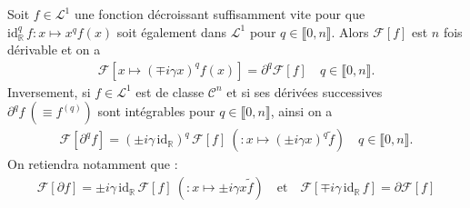 \begin{Theo} Soit $f \in \mathcal L^1$ une fonction décroissant suffisamment vite pour que $\mathrm{id}_{\mathbb R}^q \,   f \colon x \mapsto x^q f (x)$ soit également dans $\mathcal L^1$ pour $q \in \llbracket 0 , n \rrbracket$. Alors $\mathcal F[f]$ est $n$ fois dérivable et on a 
\begin{eqnarray}
 \mathcal F[x \mapsto (\mp i \gamma x)^q f(x)] = \partial^q \mathcal F[f] \quad q \in \llbracket 0 , n \rrbracket.
\end{eqnarray}
Inversement, si $f\in \mathcal L^1$ est de classe $\mathcal C^n$ et si ses dérivées successives $ \partial^q f ~ (\equiv f^{(q)})$ sont intégrables pour $q \in \llbracket 0 , n \rrbracket$, ainsi on a 
\begin{eqnarray}
 \mathcal F[\partial^q f] = (\pm i \gamma \, \mathrm{id}_{\mathbb R})^q \, \mathcal F[f] ~(\colon x \mapsto (\pm i \gamma x)^q \tilde f) \quad q \in \llbracket 0 , n \rrbracket.
\end{eqnarray}
On retiendra notamment que :
\begin{eqnarray}
     \mathcal F[\partial f] = \pm i \gamma \, \mathrm{id}_{\mathbb R} \,  \mathcal F[f] ~(\colon x \mapsto \pm i \gamma x \tilde f )\quad \mbox{et} \quad  \mathcal F[\mp i \gamma \, \mathrm{id}_{\mathbb R}\, f] = \partial \mathcal F[f]
\end{eqnarray}

\end{Theo}

